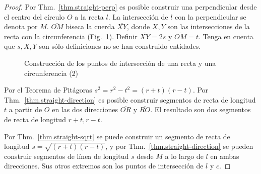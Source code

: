 \begin{proof}
Por Thm.~\ref{thm.straight-perp} es posible construir una perpendicular desde el centro del círculo $O$ a la recta $l$. La intersección de $l$ con la perpendicular se denota por $M$. $\overline{OM}$ biseca la cuerda $\overline{XY}$, donde $X, Y$ son las intersecciones de la recta con la circunferencia (Fig.~\ref{f.se-line-circle2}). Definir $\overline{XY}=2s$ y $\overline{OM}=t$. Tenga en cuenta que $s,X,Y$ son sólo definiciones no se han construido entidades.
\begin{figure}[b]
\begin{center}
\end{center}
\caption{Construcción de los puntos de intersección de una recta y una circunferencia (2)}\label{f.se-line-circle2}
\end{figure}

Por el Teorema de Pitágoras $s^2=r^2-t^2=(r+t)(r-t)$. Por Thm.~\ref{thm.straight-direction} es posible construir segmentos de recta de longitud $t$ a partir de $O$ en las dos direcciones $\overline{OR}$ y $\overline{RO}$. El resultado son dos segmentos de recta de longitud $r+t,r-t$.

Por Thm.~\ref{thm.straight-sqrt} se puede construir un segmento de recta de longitud $s=\sqrt{(r+t)(r-t)}$, y por Thm.~\ref{thm.straight-direction} se pueden construir segmentos de línea de longitud $s$ desde $M$ a lo largo de $l$ en ambas direcciones. Sus otros extremos son los puntos de intersección de $l$ y $c$.
\end{proof}

